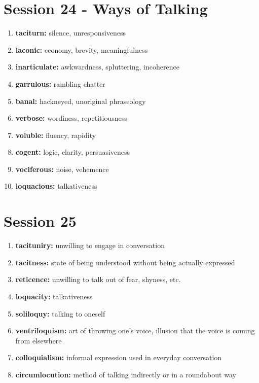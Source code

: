 \documentclass{article}
\begin{document}
\section{Session 24 - Ways of Talking}
\begin{enumerate}
    \item \textbf{taciturn: }{silence, unresponsiveness}
    \item \textbf{laconic: }{economy, brevity, meaningfulness}
    \item \textbf{inarticulate: }{awkwardness, spluttering, incoherence}
    \item \textbf{garrulous: }{rambling chatter}
    \item \textbf{banal: }{hackneyed, unoriginal phraseology}
    \item \textbf{verbose: }{wordiness, repetitiousness}
    \item \textbf{voluble: }{fluency, rapidity}
    \item \textbf{cogent: }{logic, clarity, persuasiveness}
    \item \textbf{vociferous: }{noise, vehemence}
    \item \textbf{loquacious: }{talkativeness}
    
\end{enumerate}

\section{Session 25}
\begin{enumerate}
    \item \textbf{tacituniry: }{unwilling to engage in conversation}
    \item \textbf{tacitness: }{state of being understood without being actually expressed}
    \item \textbf{reticence: }{unwilling to talk out of fear, shyness, etc.}
    \item \textbf{loquacity: }{talkativeness}
    \item \textbf{soliloquy: }{talking to oneself}
    \item \textbf{ventriloquism: }{art of throwing one's voice, illusion that the voice is coming from elsewhere}
    \item \textbf{colloquialism: }{informal expression used in everyday conversation}
    \item \textbf{circumlocution: }{method of talking indirectly or in a roundabout way}
    
\end{enumerate}
\end{document}
